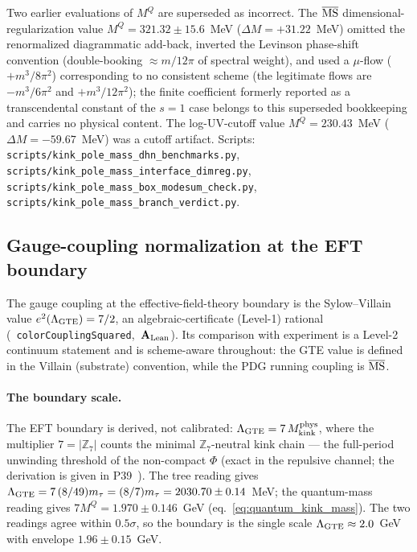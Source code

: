 \documentclass[11pt]{article}
\theoremstyle{remark}
\newcommand{\ZS}{\mathbb{Z}_7}
\newcommand{\lean}[1]{%
  \penalty-100
  \begingroup\def\_{\textunderscore\allowbreak}\texttt{#1}\endgroup}
\newcommand{\mtau}{m_\tau}
\newcommand{\CatAL}{\ensuremath{\textbf{A}_{\rm Lean}}}
\begin{document}
Two earlier evaluations of $M^Q$ are superseded as incorrect.  The
$\overline{\rm MS}$ dimensional-regularization value
$M^Q = 321.32 \pm 15.6$~MeV ($\Delta M = +31.22$~MeV) omitted the
renormalized diagrammatic add-back, inverted the Levinson phase-shift
convention (double-booking $\approx m/12\pi$ of spectral weight), and used a
$\mu$-flow ($+m^3/8\pi^2$) corresponding to no consistent scheme (the
legitimate flows are $-m^3/6\pi^2$ and $+m^3/12\pi^2$); the finite
coefficient formerly reported as a transcendental constant of the $s=1$ case
belongs to this superseded bookkeeping and carries no physical content.  The
log-UV-cutoff value $M^Q = 230.43$~MeV ($\Delta M = -59.67$~MeV) was a cutoff
artifact.
Scripts: \texttt{scripts/kink\allowbreak\_pole\allowbreak\_mass\allowbreak\_dhn\allowbreak\_benchmarks.py},
\texttt{scripts/kink\allowbreak\_pole\allowbreak\_mass\allowbreak\_interface\allowbreak\_dimreg.py},
\texttt{scripts/kink\allowbreak\_pole\allowbreak\_mass\allowbreak\_box\allowbreak\_modesum\allowbreak\_check.py},
\texttt{scripts/kink\allowbreak\_pole\allowbreak\_mass\allowbreak\_branch\allowbreak\_verdict.py}.

\subsection{Gauge-coupling normalization at the EFT boundary}
\label{ssec:coupling_boundary}

The gauge coupling at the effective-field-theory boundary is the
Sylow--Villain value $e^2(\Lambda_{\rm GTE}) = 7/2$, an algebraic-certificate
(Level-1) rational \mbox{(\lean{colorCouplingSquared}, $\CatAL$)}.  Its
comparison with experiment is a Level-2 continuum statement and is
scheme-aware throughout: the GTE value is defined in the Villain (substrate)
convention, while the PDG running coupling is $\overline{\rm MS}$.

\paragraph{The boundary scale.}
The EFT boundary is derived, not calibrated:
$\Lambda_{\rm GTE} = 7\,M_{\rm kink}^{\rm phys}$, where the multiplier
$7 = |\ZS|$ counts the minimal $\ZS$-neutral kink chain --- the full-period
unwinding threshold of the non-compact $\Phi$ (exact in the repulsive
channel; the derivation is given in P39~\cite{SpivackGTEQCDStructure}).  The
tree reading gives $\Lambda_{\rm GTE} = 7\,(8/49)\mtau = (8/7)\mtau =
2030.70 \pm 0.14$~MeV; the quantum-mass reading gives $7M^Q = 1.970 \pm
0.146$~GeV (eq.~\eqref{eq:quantum_kink_mass}).  The two readings agree
within $0.5\sigma$, so the boundary is the single scale
$\Lambda_{\rm GTE} \approx 2.0$~GeV with envelope $1.96 \pm 0.15$~GeV.
\end{document}
